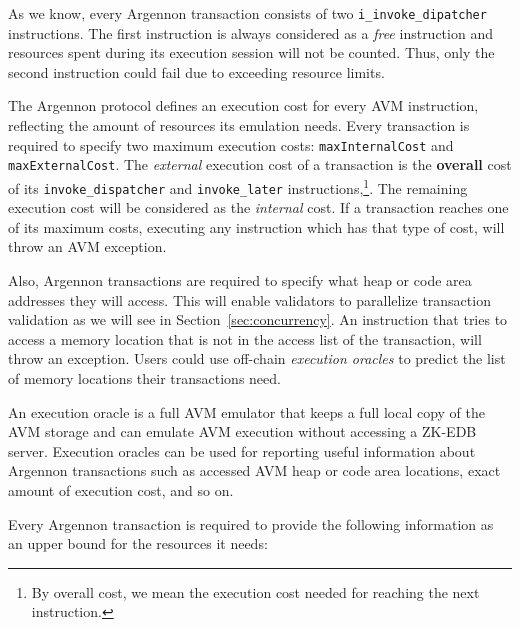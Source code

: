 As we know, every Argennon transaction consists of two \texttt{i\_invoke\_dipatcher} instructions. The first
instruction is always considered as a \emph{free} instruction and resources spent during its execution
session will not be counted. Thus, only the second instruction could fail due to exceeding resource limits.

The Argennon protocol defines an execution cost for
every AVM instruction, reflecting the amount of resources its emulation needs. Every
transaction is required to specify two maximum execution costs: \texttt{maxInternalCost}
and \texttt{maxExternalCost}. The \emph{external} execution cost of a transaction is the \textbf{overall} cost of its
\texttt{invoke\_dispatcher} and \texttt{invoke\_later} instructions,\footnote{By overall cost, we mean the execution
cost needed for reaching the next instruction.}. The remaining execution cost will be considered as
the \emph{internal} cost. If a transaction reaches one of its maximum costs, executing any instruction which has
that type of cost, will throw an AVM exception.


Also, Argennon transactions are required to specify what heap or code area addresses they will access. This will
enable validators to parallelize transaction validation as we will see in Section~\ref{sec:concurrency}. An instruction
that tries to access a memory location that is not in the access list of the transaction, will throw an exception.
Users could use off-chain \emph{execution oracles} to predict the list of memory locations their transactions need.

An execution oracle is a full AVM emulator that keeps a full local copy of the AVM storage and can emulate AVM
execution without accessing a ZK-EDB server. Execution oracles can be used for reporting useful information about
Argennon transactions such as accessed AVM heap or code area locations, exact amount of execution cost,
and so on.

Every Argennon transaction is required to provide the following information as an upper bound for the
resources it needs:

